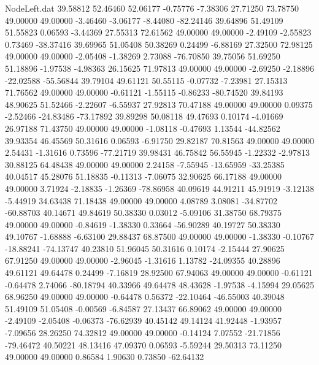 \begin{filecontents}{NodeLeft.dat}
  39.58812   52.46460   52.06177    -0.75776   -7.38306   27.71250   73.78750   49.00000   49.00000   -3.46460   -3.06177   -8.44080  -82.24146
  39.64896   51.49109   51.55823     0.06593   -3.44369   27.55313   72.61562   49.00000   49.00000   -2.49109   -2.55823    0.73469  -38.37416
  39.69965   51.05408   50.38269     0.24499   -6.88169   27.32500   72.98125   49.00000   49.00000   -2.05408   -1.38269    2.73088  -76.70850
  39.75056   51.69250   51.18896    -1.97538   -4.98363   26.15625   71.97813   49.00000   49.00000   -2.69250   -2.18896  -22.02588  -55.56844
  39.79104   49.61121   50.55115    -0.07732   -7.23981   27.15313   71.76562   49.00000   49.00000   -0.61121   -1.55115   -0.86233  -80.74520
  39.84193   48.90625   51.52466    -2.22607   -6.55937   27.92813   70.47188   49.00000   49.00000    0.09375   -2.52466  -24.83486  -73.17892
  39.89298   50.08118   49.47693     0.10174   -4.01669   26.97188   71.43750   49.00000   49.00000   -1.08118   -0.47693    1.13544  -44.82562
  39.93354   46.45569   50.31616     0.06593   -6.91750   29.82187   70.81563   49.00000   49.00000    2.54431   -1.31616    0.73596  -77.21719
  39.98431   46.75842   56.55945    -1.22332   -2.97813   30.88125   64.48438   49.00000   49.00000    2.24158   -7.55945  -13.65959  -33.25385
  40.04517   45.28076   51.18835    -0.11313   -7.06075   32.90625   66.17188   49.00000   49.00000    3.71924   -2.18835   -1.26369  -78.86958
  40.09619   44.91211   45.91919    -3.12138   -5.44919   34.63438   71.18438   49.00000   49.00000    4.08789    3.08081  -34.87702  -60.88703
  40.14671   49.84619   50.38330     0.03012   -5.09106   31.38750   68.79375   49.00000   49.00000   -0.84619   -1.38330    0.33664  -56.90289
  40.19727   50.38330   49.10767    -1.68888   -6.63100   29.88437   68.87500   49.00000   49.00000   -1.38330   -0.10767  -18.88241  -74.13747
  40.23810   51.96045   50.31616     0.10174   -2.15444   27.90625   67.91250   49.00000   49.00000   -2.96045   -1.31616    1.13782  -24.09355
  40.28896   49.61121   49.64478     0.24499   -7.16819   28.92500   67.94063   49.00000   49.00000   -0.61121   -0.64478    2.74066  -80.18794
  40.33966   49.64478   48.43628    -1.97538   -4.15994   29.05625   68.96250   49.00000   49.00000   -0.64478    0.56372  -22.10464  -46.55003
  40.39048   51.49109   51.05408    -0.00569   -6.84587   27.13437   66.89062   49.00000   49.00000   -2.49109   -2.05408   -0.06373  -76.62939
  40.45142   49.14124   41.92448    -1.93957   -7.09656   28.26250   74.32812   49.00000   49.00000   -0.14124    7.07552  -21.71856  -79.46472
  40.50221   48.13416   47.09370     0.06593   -5.59244   29.50313   73.11250   49.00000   49.00000    0.86584    1.90630    0.73850  -62.64132

\end{filecontents}
